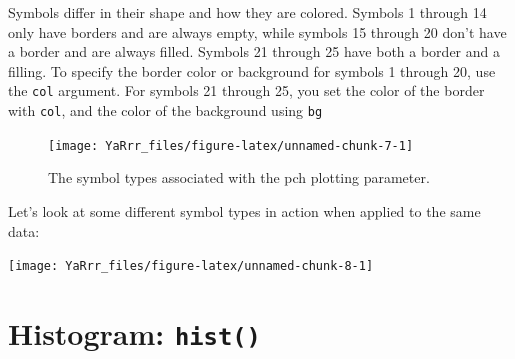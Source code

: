 \documentclass[]{book}
\theoremstyle{definition}
\theoremstyle{definition}
\theoremstyle{remark}
\begin{document}
Symbols differ in their shape and how they are colored. Symbols 1
through 14 only have borders and are always empty, while symbols 15
through 20 don't have a border and are always filled. Symbols 21 through
25 have both a border and a filling. To specify the border color or
background for symbols 1 through 20, use the \texttt{col} argument. For
symbols 21 through 25, you set the color of the border with
\texttt{col}, and the color of the background using \texttt{bg}

\begin{figure}

{\centering \texttt{[image: YaRrr\_files/figure-latex/unnamed-chunk-7-1]} 

}

\caption{The symbol types associated with the pch plotting parameter.}\label{fig:unnamed-chunk-7}
\end{figure}

Let's look at some different symbol types in action when applied to the
same data:

\begin{center}\texttt{[image: YaRrr\_files/figure-latex/unnamed-chunk-8-1]} \end{center}

\section{\texorpdfstring{Histogram:
\texttt{hist()}}{Histogram: hist()}}\label{histogram-hist}
\end{document}
